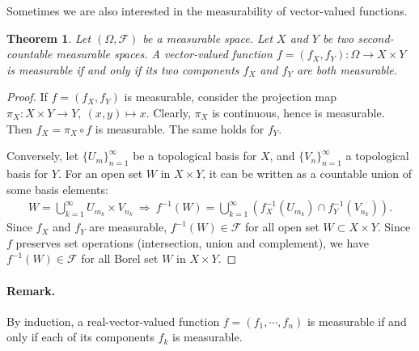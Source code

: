 \documentclass{article}
\numberwithin{equation}{section}
\theoremstyle{plain}
\newtheorem{theorem}{Theorem}[section]
\theoremstyle{definition}
\begin{document}
Sometimes we are also interested in the measurability of vector-valued functions.

\begin{theorem}\label{thm:1.35} Let $(\Omega,\mathscr{F})$ be a measurable space. Let $X$ and $Y$ be two second-countable measurable spaces. A vector-valued function $f=(f_X,f_Y):\Omega\to X\times Y$ is measurable if and only if its two components $f_X$ and $f_Y$ are both measurable.
\end{theorem}
\begin{proof}
If $f=(f_X,f_Y)$ is measurable, consider the projection map $\pi_X:X\times Y\to Y,\ (x,y)\mapsto x$. Clearly, $\pi_X$ is continuous, hence is measurable. Then $f_X=\pi_X\circ f$ is measurable. The same holds for $f_Y$.

Conversely, let $\{U_m\}_{n=1}^\infty$ be a topological basis for $X$, and $\{V_n\}_{n=1}^\infty$ a topological basis for $Y$. For an open set $W$ in $X\times Y$, it can be written as a countable union of some basis elements:
\begin{align*}
	W=\bigcup_{k=1}^\infty U_{m_k}\times V_{n_k}\ \Rightarrow\ f^{-1}(W)=\bigcup_{k=1}^\infty\left(f_X^{-1}(U_{m_k})\cap f_Y^{-1}(V_{n_k})\right).
\end{align*}
Since $f_X$ and $f_Y$ are measurable, $f^{-1}(W)\in\mathscr{F}$ for all open set $W\subset X\times Y$. Since $f$ preserves set operations (intersection, union and complement), we have $f^{-1}(W)\in\mathscr{F}$ for all Borel set $W$ in $X\times Y$.
\end{proof}

\paragraph{Remark.} By induction, a real-vector-valued function $f=(f_1,\cdots,f_n)$ is measurable if and only if each of its components $f_k$ is measurable.
\end{document}
